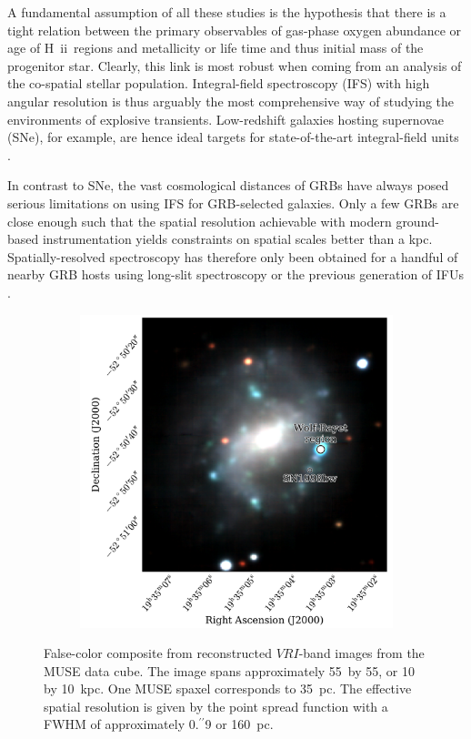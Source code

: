 \documentclass[traditabstract, referee]{aa}
\newcommand{\farc}{\hbox{$.\!\!^{\prime\prime}$}}
\newcommand{\hii}{\mbox{H~{\sc ii}}}
\begin{document}
A fundamental assumption of all these studies is the hypothesis that there is a tight relation between the primary observables of gas-phase oxygen abundance or age of \hii~regions and metallicity or life time and thus initial mass of the progenitor star. Clearly, this link is most robust when coming from an analysis of the co-spatial stellar population. Integral-field spectroscopy (IFS) with high angular resolution is thus arguably the most comprehensive way of studying the environments of explosive transients. Low-redshift galaxies hosting supernovae (SNe), for example, are hence ideal targets for state-of-the-art integral-field units \citep[IFUs, e.g.][]{2013AJ....146...30K, 2013AJ....146...31K, 2014A&A...572A..38G}.

In contrast to SNe, the vast cosmological distances of GRBs \citep[e.g.][]{2009ApJS..185..526F, 2009Natur.461.1254T, 2012ApJ...758...46K} have always posed serious limitations on using IFS for GRB-selected galaxies. Only a few GRBs are close enough such that the spatial resolution achievable with modern ground-based instrumentation yields constraints on spatial scales better than a kpc. Spatially-resolved spectroscopy has therefore only been obtained for a handful of nearby GRB hosts using long-slit spectroscopy \citep[e.g.][]{2008ApJ...676.1151T, 2011ApJ...739...23L, 2015A&A...579A.126S} or the previous generation of IFUs \citep{2008A&A...490...45C, 2014MNRAS.441.2034T}.

\begin{figure}
\begin{subfigure}{.48\textwidth}
  \includegraphics[width=0.999\linewidth]{Figs/MUSE_SN1998bw_RGB.pdf}
\end{subfigure}
\caption{False-color composite from reconstructed $VRI$-band images from the MUSE data cube. The image spans approximately 55\arcsec~by 55\arcsec, or 10 by 10~kpc. One MUSE spaxel corresponds to 35~pc. The effective spatial resolution is given by the point spread function with a FWHM of approximately 0\farc{9} or 160~pc.}
\label{fig:Host}
\end{figure}
\end{document}
